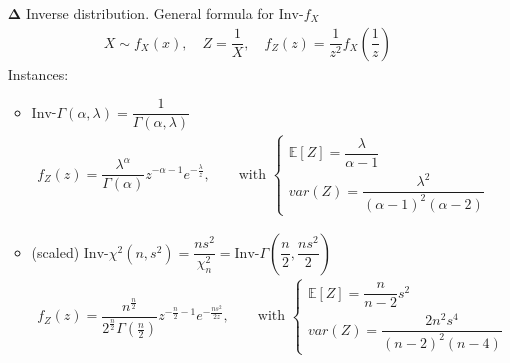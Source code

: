 \begin{itemize}[topsep=2pt,itemsep=0pt]
    
    
    \item[$ \bm{\Delta } $] Inverse distribution. General formula for $ \mathrm{Inv}$-$f_X  $
    \begin{align}
        X\sim f_X(x),\quad Z=\dfrac{1}{X},\quad f_Z(z)=\dfrac{1}{z^2}f_X(\dfrac{1}{z}) 
    \end{align}
    Instances:
    \begin{itemize}[topsep=2pt,itemsep=0pt]
        \item $ \mathrm{Inv}  $-$ \Gamma (\alpha ,\lambda  )= \dfrac{1}{\Gamma (\alpha ,\lambda  )}$
        \begin{align}
            f_Z(z)=\dfrac{\lambda ^\alpha }{\Gamma (\alpha )}z^{-\alpha -1}e^{-\frac{\lambda }{z}}  ,\qquad \text{with } \begin{cases}
                \mathbb{E}\left[ Z \right] =\dfrac{\lambda }{\alpha -1}\\
                var(Z)=\dfrac{\lambda ^2}{(\alpha -1)^2(\alpha -2)} 
            \end{cases}
        \end{align}
        \item (scaled) $ \mathrm{Inv}$-$\chi^2(n,s^2)=\dfrac{ns^2}{\chi^2_n}=\mathrm{Inv}$-$ \Gamma (\dfrac{n}{2},\dfrac{ns^2}{2}) $
        \begin{align}
            f_Z(z)= \dfrac{n^{\frac{n}{2}}}{2^{\frac{n}{2}}\Gamma (\frac{n}{2})}z^{-\frac{n}{2}-1}e^{-\frac{ns^2}{2z}} ,\qquad \text{with }\begin{cases}
                \mathbb{E}\left[ Z \right]=\dfrac{n}{n-2}s^2\\
                 var(Z)=  \dfrac{2n^2s^4}{(n-2)^2(n-4)}
            \end{cases}
        \end{align}
    

\end{itemize}
\end{itemize}
